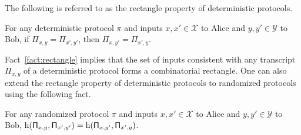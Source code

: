 \documentclass[11pt,letterpaper]{article}
\theoremstyle{definition}
\newcommand{\Prot}{\ensuremath{\Pi}}
\newcommand{\prot}{\ensuremath{\pi}}
\newcommand{\rv}[1]{\ensuremath{\mathsf{#1}}}
\newcommand{\rProt}{\rv{\Prot}}
\newcommand{\hd}[2]{\ensuremath{\textnormal{h}(#1,#2)}\xspace}
\begin{document}
The following is referred to as the rectangle property of deterministic protocols. 
\begin{fact}\label{fact:rectangle}
	For any deterministic protocol $\prot$ and inputs $x,x' \in \mathcal{X}$ to Alice and $y,y' \in \mathcal{Y}$ to Bob, if $\Prot_{x,y} = \Prot_{x',y'}$, then $\Prot_{x,y'} = \Prot_{x',y}$. 
\end{fact}
\noindent
Fact~\ref{fact:rectangle} implies that the set of inputs consistent with any transcript $\Prot_{x,y}$ of a deterministic protocol forms a combinatorial rectangle. 
One can also extend the rectangle property of deterministic protocols to randomized protocols using the following fact. 
\begin{fact}\label{fact:r-rectangle}
	For any randomized protocol $\prot$ and inputs $x,x' \in \mathcal{X}$ to Alice and $y,y' \in \mathcal{Y}$ to Bob, $\hd{\rProt_{x,y}}{\rProt_{x',y'}} = \hd{\rProt_{x,y'}}{\rProt_{x',y}}$. 
\end{fact}
\end{document}
